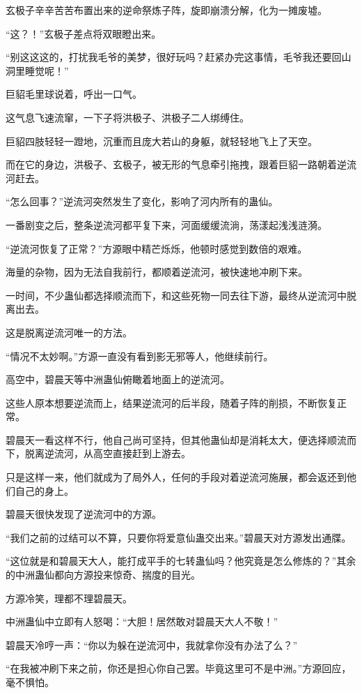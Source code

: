 \begin{this_body}
玄极子辛辛苦苦布置出来的逆命祭炼子阵，旋即崩溃分解，化为一摊废墟。

“这？！”玄极子差点将双眼瞪出来。

“别这这这的，打扰我毛爷的美梦，很好玩吗？赶紧办完这事情，毛爷我还要回山洞里睡觉呢！”

巨貂毛里球说着，呼出一口气。

这气息飞速流窜，一下子将洪极子、洪极子二人绑缚住。

巨貂四肢轻轻一蹬地，沉重而且庞大若山的身躯，就轻轻地飞上了天空。

而在它的身边，洪极子、玄极子，被无形的气息牵引拖拽，跟着巨貂一路朝着逆流河赶去。

“怎么回事？”逆流河突然发生了变化，影响了河内所有的蛊仙。

一番剧变之后，整条逆流河都平复下来，河面缓缓流淌，荡漾起浅浅涟漪。

“逆流河恢复了正常？”方源眼中精芒烁烁，他顿时感觉到数倍的艰难。

海量的杂物，因为无法自我前行，都顺着逆流河，被快速地冲刷下来。

一时间，不少蛊仙都选择顺流而下，和这些死物一同去往下游，最终从逆流河中脱离出去。

这是脱离逆流河唯一的方法。

“情况不太妙啊。”方源一直没有看到影无邪等人，他继续前行。

高空中，碧晨天等中洲蛊仙俯瞰着地面上的逆流河。

这些人原本想要逆流而上，结果逆流河的后半段，随着子阵的削损，不断恢复正常。

碧晨天一看这样不行，他自己尚可坚持，但其他蛊仙却是消耗太大，便选择顺流而下，脱离逆流河，从高空直接赶到上游去。

只是这样一来，他们就成为了局外人，任何的手段对着逆流河施展，都会返还到他们自己的身上。

碧晨天很快发现了逆流河中的方源。

“我们之前的过结可以不算，只要你将爱意仙蛊交出来。”碧晨天对方源发出通牒。

“这位就是和碧晨天大人，能打成平手的七转蛊仙吗？他究竟是怎么修炼的？”其余的中洲蛊仙都向方源投来惊奇、揣度的目光。

方源冷笑，理都不理碧晨天。

中洲蛊仙中立即有人怒喝：“大胆！居然敢对碧晨天大人不敬！”

碧晨天冷哼一声：“你以为躲在逆流河中，我就拿你没有办法了么？”

“在我被冲刷下来之前，你还是担心你自己罢。毕竟这里可不是中洲。”方源回应，毫不惧怕。


\end{this_body}
